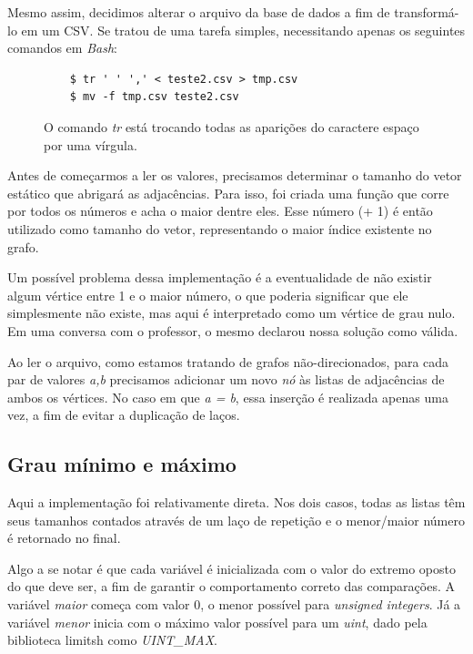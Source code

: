\documentclass[a4paper, 12pt]{article}
\begin{document}
Mesmo assim, decidimos alterar o arquivo da base de dados a fim de transformá-lo
em um CSV. Se tratou de uma tarefa simples, necessitando apenas os seguintes comandos
em \textit{Bash}:

\begin{figure}[h]
\centering
	\begin{verbatim}
	$ tr ' ' ',' < teste2.csv > tmp.csv
	$ mv -f tmp.csv teste2.csv
	\end{verbatim}
	\vspace{-1.0cm}
	\caption{O comando \textit{tr} está trocando todas as aparições do caractere
	espaço por uma vírgula.}
\end{figure}

Antes de começarmos a ler os valores, precisamos determinar o tamanho do vetor
estático que abrigará as adjacências. Para isso, foi criada uma função que corre
por todos os números e acha o maior dentre eles. Esse número (+ 1) é então utilizado como
tamanho do vetor, representando o maior índice existente no grafo.

Um possível problema dessa implementação é a eventualidade de não existir algum
vértice entre 1 e o maior número, o que poderia significar que ele simplesmente
não existe, mas aqui é interpretado como um vértice de grau nulo. Em uma conversa
com o professor, o mesmo declarou nossa solução como válida.

Ao ler o arquivo, como estamos tratando de grafos não-direcionados, para cada par
de valores \textit{a,b} precisamos adicionar um novo \textit{nó} às listas de
adjacências de ambos os vértices. No caso em que \textit{a = b}, essa inserção é
realizada apenas uma vez, a fim de evitar a duplicação de laços.

\subsection{Grau mínimo e máximo}

Aqui a implementação foi relativamente direta. Nos dois casos, todas as listas
têm seus tamanhos contados através de um laço de repetição e o menor/maior número
é retornado no final.

Algo a se notar é que cada variável é inicializada com o valor do extremo oposto
do que deve ser, a fim de garantir o comportamento correto das comparações.
A variável \textit{maior} começa com valor 0, o menor possível para
\textit{unsigned integers}. Já a variável \textit{menor} inicia com o máximo valor possível
para um \textit{uint}, dado pela biblioteca limitsh como \textit{UINT\_MAX}.
\end{document}
